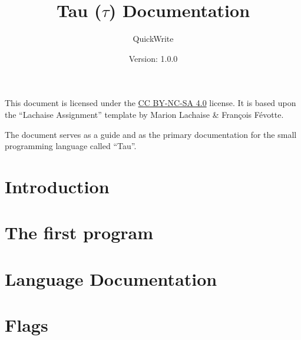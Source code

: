 \documentclass[a4paper]{article}
\title{Tau ($\tau$) Documentation} %
\author{QuickWrite} %
\date{Version: 1.0.0} %
\newcommand{\importsection}[2]{\newpage
\section{#2}
}
\begin{document}
\maketitle %

This document is licensed under the \href{https://creativecommons.org/licenses/by-nc-sa/4.0/}{CC BY-NC-SA 4.0} license. 
It is based upon the ``Lachaise Assignment'' template by Marion Lachaise \& François Févotte.

The document serves as a guide and as the primary documentation for the small programming language called ``Tau''.

\tableofcontents

\importsection{sections/introduction}{Introduction}

\importsection{sections/first-program}{The first program}

\importsection{sections/language-documentation}{Language Documentation}

\importsection{sections/flags}{Flags}
\end{document}
